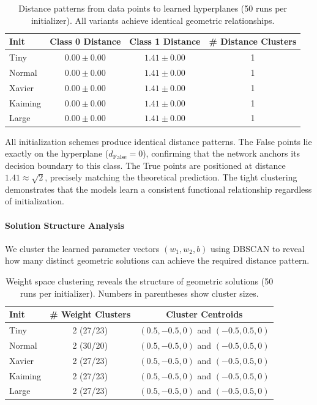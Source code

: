 \begin{table}[ht]
\centering
\caption{Distance patterns from data points to learned hyperplanes (50 runs per initializer). All variants achieve identical geometric relationships.}
\label{tab:abs1-distance-clusters}
\begin{tabular}{lccc}
\toprule
Init & Class 0 Distance & Class 1 Distance & \# Distance Clusters \\
\midrule
Tiny    & $0.00 \pm 0.00$ & $1.41 \pm 0.00$ & 1 \\
Normal  & $0.00 \pm 0.00$ & $1.41 \pm 0.00$ & 1 \\
Xavier  & $0.00 \pm 0.00$ & $1.41 \pm 0.00$ & 1 \\
Kaiming & $0.00 \pm 0.00$ & $1.41 \pm 0.00$ & 1 \\
Large   & $0.00 \pm 0.00$ & $1.41 \pm 0.00$ & 1 \\
\bottomrule
\end{tabular}
\end{table}

All initialization schemes produce identical distance patterns. The False points lie exactly on the hyperplane ($d_{\text{False}} = 0$), confirming that the network anchors its decision boundary to this class. The True points are positioned at distance $1.41 \approx \sqrt{2}$, precisely matching the theoretical prediction. The tight clustering demonstrates that the models learn a consistent functional relationship regardless of initialization.

\paragraph{Solution Structure Analysis}
We cluster the learned parameter vectors $(w_1, w_2, b)$ using DBSCAN to reveal how many distinct geometric solutions can achieve the required distance pattern.

\begin{table}[ht]
\centering
\caption{Weight space clustering reveals the structure of geometric solutions (50 runs per initializer). Numbers in parentheses show cluster sizes.}
\label{tab:abs1-weight-clusters}
\begin{tabular}{lcc}
\toprule
Init & \# Weight Clusters & Cluster Centroids \\
\midrule
Tiny    & 2 (27/23) & $(0.5, -0.5, 0)$ and $(-0.5, 0.5, 0)$ \\
Normal  & 2 (30/20) & $(0.5, -0.5, 0)$ and $(-0.5, 0.5, 0)$ \\
Xavier  & 2 (27/23) & $(0.5, -0.5, 0)$ and $(-0.5, 0.5, 0)$ \\
Kaiming & 2 (27/23) & $(0.5, -0.5, 0)$ and $(-0.5, 0.5, 0)$ \\
Large   & 2 (27/23) & $(0.5, -0.5, 0)$ and $(-0.5, 0.5, 0)$ \\
\bottomrule
\end{tabular}
\end{table}

